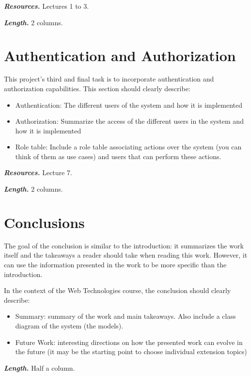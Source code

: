 \documentclass[letterpaper,twocolumn]{article}
\newcommand{\myparagraph}[1]{\vspace{0.1cm}\noindent \textbf{\textit{#1.}}}
\begin{document}
\myparagraph{Resources} Lectures 1 to 3.

\myparagraph{Length} 2 columns.



\section{Authentication and Authorization}

This project's third and final task is to incorporate authentication and authorization capabilities.
This section should clearly describe:

\begin{itemize}
    \item Authentication: The different users of the system and how it is implemented
    \item Authorization: Summarize the access of the different users in the system and how it is implemented
    \item Role table: Include a role table associating actions over the system (you can think of them as use cases) and users that can perform these actions.
\end{itemize}

\myparagraph{Resources} Lecture 7.

\myparagraph{Length} 2 columns.

\section{Conclusions}

The goal of the conclusion is similar to the introduction: it summarizes the work itself and the takeaways a reader should take when reading this work. However, it can use the information presented in the work to be more specific than the introduction.

In the context of the Web Technologies course, the conclusion should clearly describe:

\begin{itemize}
    \item Summary: summary of the work and main takeaways. Also include a class diagram of the system (the models).
    \item Future Work: interesting directions on how the presented work can evolve in the future (it may be the starting point to choose individual extension topics)
\end{itemize}

\myparagraph{Length} Half a column.
\end{document}
